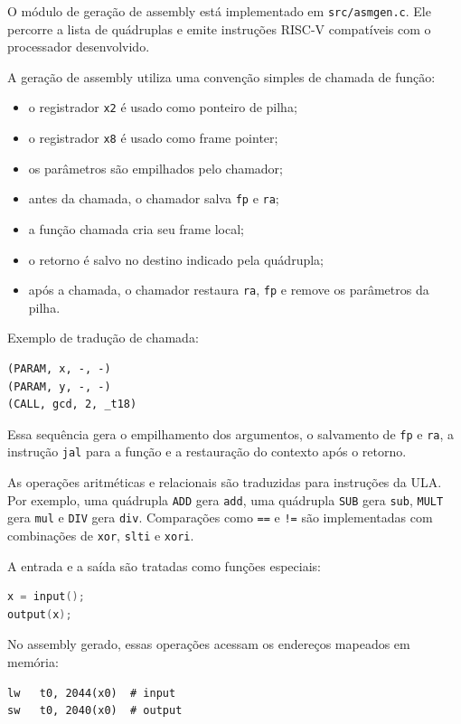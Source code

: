 \documentclass[12pt,a4paper]{report}
\begin{document}
O módulo de geração de assembly está implementado em \texttt{src/asmgen.c}. Ele percorre a lista de quádruplas e emite instruções RISC-V compatíveis com o processador desenvolvido.

A geração de assembly utiliza uma convenção simples de chamada de função:

\begin{itemize}
    \item o registrador \texttt{x2} é usado como ponteiro de pilha;
    \item o registrador \texttt{x8} é usado como frame pointer;
    \item os parâmetros são empilhados pelo chamador;
    \item antes da chamada, o chamador salva \texttt{fp} e \texttt{ra};
    \item a função chamada cria seu frame local;
    \item o retorno é salvo no destino indicado pela quádrupla;
    \item após a chamada, o chamador restaura \texttt{ra}, \texttt{fp} e remove os parâmetros da pilha.
\end{itemize}

Exemplo de tradução de chamada:

\begin{lstlisting}
(PARAM, x, -, -)
(PARAM, y, -, -)
(CALL, gcd, 2, _t18)
\end{lstlisting}

Essa sequência gera o empilhamento dos argumentos, o salvamento de \texttt{fp} e \texttt{ra}, a instrução \texttt{jal} para a função e a restauração do contexto após o retorno.

As operações aritméticas e relacionais são traduzidas para instruções da ULA. Por exemplo, uma quádrupla \texttt{ADD} gera \texttt{add}, uma quádrupla \texttt{SUB} gera \texttt{sub}, \texttt{MULT} gera \texttt{mul} e \texttt{DIV} gera \texttt{div}. Comparações como \texttt{==} e \texttt{!=} são implementadas com combinações de \texttt{xor}, \texttt{slti} e \texttt{xori}.

A entrada e a saída são tratadas como funções especiais:

\begin{lstlisting}[language=C]
x = input();
output(x);
\end{lstlisting}

No assembly gerado, essas operações acessam os endereços mapeados em memória:

\begin{lstlisting}
lw   t0, 2044(x0)  # input
sw   t0, 2040(x0)  # output
\end{lstlisting}
\end{document}
